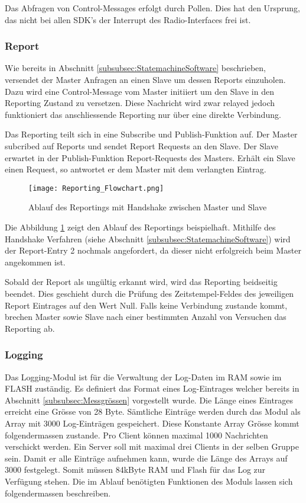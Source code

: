 Das Abfragen von Control-Messages erfolgt durch Pollen.
Dies hat den Ursprung, das nicht bei allen SDK's der Interrupt des Radio-Interfaces frei ist.


\subsubsection{Report}\label{subsubsec:Report}

Wie bereits in Abschnitt \ref{subsubsec:StatemachineSoftware} beschrieben, versendet der Master Anfragen an einen Slave um dessen Reports einzuholen.
Dazu wird eine Control-Message vom Master initiiert um den Slave in den Reporting Zustand zu versetzen.
Diese Nachricht wird zwar relayed jedoch funktioniert das anschliessende Reporting nur über eine direkte Verbindung.

Das Reporting teilt sich in eine Subscribe und Publish-Funktion auf.
Der Master subcribed auf Reports und sendet Report Requests an den Slave.
Der Slave erwartet in der Publish-Funktion Report-Requests des Masters.
Erhält ein Slave einen Request, so antwortet er dem Master mit dem verlangten Eintrag.

\begin{figure}[H]
	\centering
	\texttt{[image: Reporting\_Flowchart.png]}
	\caption{Ablauf des Reportings mit Handshake zwischen Master und Slave}\label{fig:ReportingAblauf}
\end{figure}

Die Abbildung \ref{fig:ReportingAblauf} zeigt den Ablauf des Reportings beispielhaft.
Mithilfe des Handshake Verfahren (siehe Abschnitt \ref{subsubsec:StatemachineSoftware}) wird der Report-Entry 2 nochmals angefordert, da dieser nicht erfolgreich beim Master angekommen ist.

Sobald der Report als ungültig erkannt wird, wird das Reporting beidseitig beendet.
Dies geschieht durch die Prüfung des Zeitstempel-Feldes des jeweiligen Report Eintrages auf den Wert Null.
Falls keine Verbindung zustande kommt, brechen Master sowie Slave nach einer bestimmten Anzahl von Versuchen das Reporting ab.


\subsubsection{Logging}\label{subsubsec:Logging}
Das Logging-Modul ist für die Verwaltung der Log-Daten im RAM sowie im FLASH zuständig.
Es definiert das Format eines Log-Eintrages welcher bereits in Abschnitt \ref{subsubsec:Messgrössen} vorgestellt wurde.
Die Länge eines Eintrages erreicht eine Grösse von 28 Byte.
Sämtliche Einträge werden durch das Modul als Array mit 3000 Log-Einträgen gespeichert.
Diese Konstante Array Grösse kommt folgendermassen zustande.
Pro Client können maximal 1000 Nachrichten verschickt werden.
Ein Server soll mit maximal drei Clients in der selben Gruppe sein.
Damit er alle Einträge aufnehmen kann, wurde die Länge des Arrays auf 3000 festgelegt.
Somit müssen 84kByte RAM und Flash für das Log zur Verfügung stehen. Die im Ablauf benötigten Funktionen des Moduls lassen sich folgendermassen beschreiben. 

